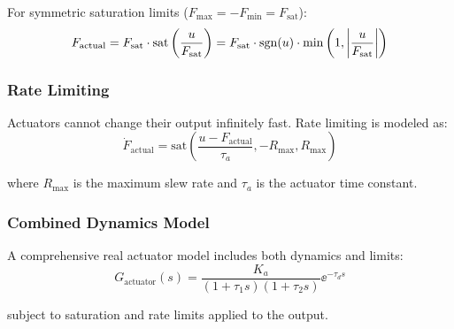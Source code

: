 For symmetric saturation limits ($F_{\max} = -F_{\min} = F_{\text{sat}}$):
\begin{equation}
F_{\text{actual}} = F_{\text{sat}} \cdot \text{sat}\left(\frac{u}{F_{\text{sat}}}\right) = F_{\text{sat}} \cdot \operatorname{sgn}(u) \cdot \min\left(1, \left|\frac{u}{F_{\text{sat}}}\right|\right)
\end{equation}

\subsubsection{Rate Limiting}

Actuators cannot change their output infinitely fast. Rate limiting is modeled as:
\begin{equation}
\boxed{\dot{F}_{\text{actual}} = \text{sat}\left(\frac{u - F_{\text{actual}}}{\tau_a}, -R_{\max}, R_{\max}\right)}
\label{eq:rate_limit}
\end{equation}

where $R_{\max}$ is the maximum slew rate and $\tau_a$ is the actuator time constant.

\subsubsection{Combined Dynamics Model}

A comprehensive real actuator model includes both dynamics and limits:
\begin{equation}
G_{\text{actuator}}(s) = \frac{K_a}{(1 + \tau_1 s)(1 + \tau_2 s)} \ee^{-\tau_d s}
\label{eq:real_actuator_tf}
\end{equation}

subject to saturation and rate limits applied to the output.


